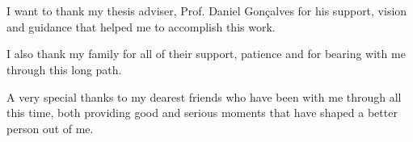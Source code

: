 
\section*{\acknowledgments}


I want to thank my thesis adviser, Prof. Daniel Gonçalves for his support, vision and guidance that helped me to accomplish this work.

I also thank my family for all of their support, patience and for bearing with me through this long path.

A very special thanks to my dearest friends who have been with me through all this time, both providing good and serious moments that have shaped a better person out of me.


\cleardoublepage

